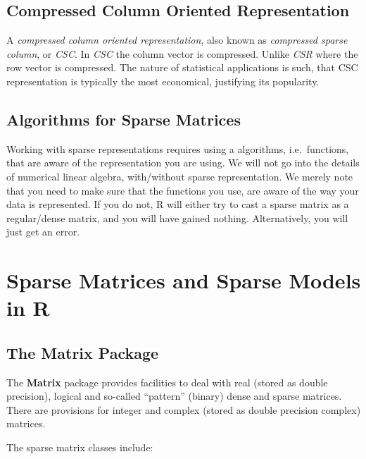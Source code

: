 \documentclass[]{book}
\theoremstyle{definition}
\theoremstyle{definition}
\theoremstyle{definition}
\theoremstyle{remark}
\begin{document}
\hypertarget{compressed-column-oriented-representation}{%
\subsection{Compressed Column Oriented Representation}\label{compressed-column-oriented-representation}}

A \emph{compressed column oriented representation}, also known as \emph{compressed sparse column}, or \emph{CSC}.
In \emph{CSC} the column vector is compressed. Unlike \emph{CSR} where the row vector is compressed.
The nature of statistical applications is such, that CSC representation is typically the most economical, justifying its popularity.

\hypertarget{algorithms-for-sparse-matrices}{%
\subsection{Algorithms for Sparse Matrices}\label{algorithms-for-sparse-matrices}}

Working with sparse representations requires using a algorithms, i.e.~functions, that are aware of the representation you are using.
We will not go into the details of numerical linear algebra, with/without sparse representation.
We merely note that you need to make sure that the functions you use, are aware of the way your data is represented.
If you do not, R will either try to cast a sparse matrix as a regular/dense matrix, and you will have gained nothing.
Alternatively, you will just get an error.

\hypertarget{sparse-matrices-and-sparse-models-in-r}{%
\section{Sparse Matrices and Sparse Models in R}\label{sparse-matrices-and-sparse-models-in-r}}

\hypertarget{the-matrix-package}{%
\subsection{The Matrix Package}\label{the-matrix-package}}

The \textbf{Matrix} package provides facilities to deal with real (stored as double precision), logical and so-called ``pattern'' (binary) dense and sparse matrices.
There are provisions for integer and complex (stored as double precision complex) matrices.

The sparse matrix classes include:
\end{document}
